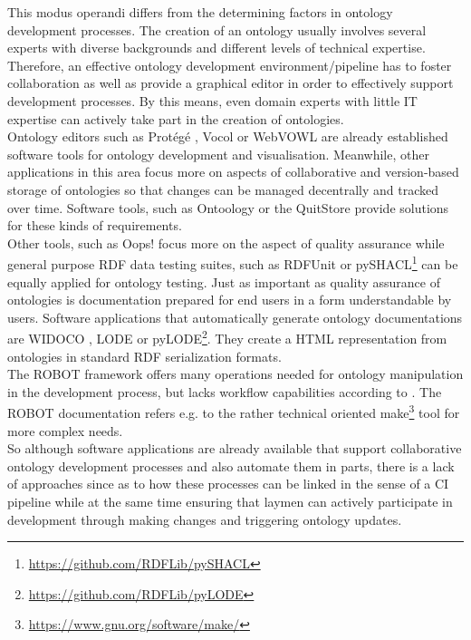 \documentclass[sigconf]{acmart}
\begin{document}
This modus operandi differs from the determining factors in ontology development processes. The creation of an ontology usually involves several experts with diverse backgrounds and different levels of technical expertise. Therefore, an effective ontology development environment/pipeline has to foster collaboration as well as provide a graphical editor in order to effectively support development processes. By this means, even domain experts with little IT expertise can actively take part in the creation of ontologies.\\
Ontology editors such as Protégé \cite{protege}, Vocol \cite{halilaj} or WebVOWL \cite{lohmann} are already established software tools for ontology development and visualisation. Meanwhile, other applications in this area focus more on aspects of collaborative and version-based storage of ontologies so that changes can be managed decentrally and tracked over time. Software tools, such as Ontoology \cite{alobaid} or the QuitStore \cite{arndt} provide solutions for these kinds of requirements.\\
Other tools, such as Oops! focus more on the aspect of quality assurance \cite{poveda} while general purpose RDF data testing suites, such as RDFUnit \cite{rdfunit} or pySHACL\footnote{\url{https://github.com/RDFLib/pySHACL}} can be equally applied for ontology testing. Just as important as quality assurance of ontologies is documentation prepared for end users in a form understandable by users. Software applications that automatically generate ontology documentations are WIDOCO \cite{widoco}, LODE \cite{lode} or pyLODE\footnote{\url{https://github.com/RDFLib/pyLODE}}. They create a HTML representation from ontologies in standard RDF serialization formats.\\
The ROBOT framework \cite{jackson} offers many operations needed for ontology manipulation in the development process, but lacks workflow capabilities according to \cite{jackson}. The ROBOT documentation refers e.g. to the rather technical oriented make\footnote{\url{https://www.gnu.org/software/make/}} tool for more complex needs.\\
So although software applications are already available that support collaborative ontology development processes and also automate them in parts, there is a lack of approaches since \cite{mungall} as to how these processes can be linked in the sense of a CI pipeline while at the same time ensuring that laymen can actively participate in development through making changes and triggering ontology updates.
\end{document}
